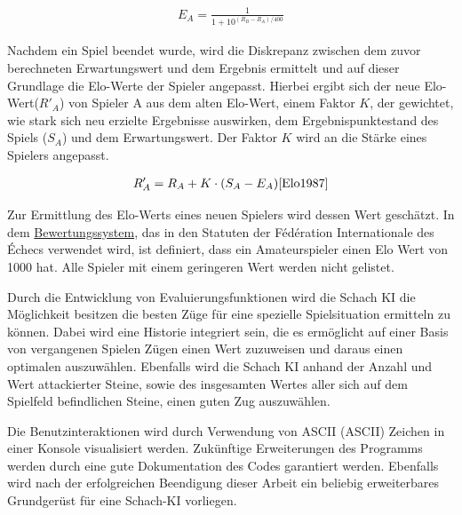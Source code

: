 \begin{equation}
\begin{aligned}
E_{A} = \frac{1}{1 + 10^{({R_{B} - R_{A}})/400}}
\end{aligned}
\end{equation}

Nachdem ein Spiel beendet wurde, wird die Diskrepanz zwischen dem zuvor berechneten Erwartungswert und dem Ergebnis ermittelt und auf dieser Grundlage die Elo-Werte der Spieler angepasst. Hierbei ergibt sich der neue Elo-Wert($R'_{A}$) von Spieler A aus dem alten Elo-Wert, einem Faktor $K$, der gewichtet, wie stark sich neu erzielte Ergebnisse auswirken, dem Ergebnispunktestand des Spiels ($S_{A}$) und dem Erwartungswert. Der Faktor $K$ wird an die Stärke eines Spielers angepasst.

\begin{equation}
\begin{aligned}
R'_{A} = R_{A} + K \cdot (S_{A} - E_{A})
\cite{Elo1987}
\end{aligned}
\end{equation}

Zur Ermittlung des Elo-Werts eines neuen Spielers wird dessen Wert geschätzt. In dem \href{https://www.fide.com/fide/handbook.html?id=197&view=article}{Bewertungssystem}, das in den Statuten der Fédération Internationale des Échecs verwendet wird, ist definiert, dass ein Amateurspieler einen Elo Wert von 1000 hat. Alle Spieler mit einem geringeren Wert werden nicht gelistet.\cite{FIDE2017}

Durch die Entwicklung von Evaluierungsfunktionen wird die Schach KI die Möglichkeit besitzen die besten Züge für eine spezielle Spielsituation ermitteln zu können. Dabei wird eine Historie integriert sein, die es ermöglicht auf einer Basis von vergangenen Spielen Zügen einen Wert zuzuweisen und daraus einen optimalen auszuwählen. Ebenfalls wird die Schach KI anhand der Anzahl und Wert attackierter Steine, sowie des insgesamten Wertes aller sich auf dem Spielfeld befindlichen Steine, einen guten Zug auszuwählen.

Die Benutzinteraktionen wird durch Verwendung von \acs{ASCII} (\acl{ASCII}) Zeichen in einer Konsole visualisiert werden. Zukünftige Erweiterungen des Programms werden durch eine gute Dokumentation des Codes garantiert werden. Ebenfalls wird nach der erfolgreichen Beendigung dieser Arbeit ein beliebig erweiterbares Grundgerüst für eine Schach-KI vorliegen.



